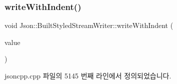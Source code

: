 \mbox{\label{struct_json_1_1_built_styled_stream_writer_a6e80e1a0d5f64df2ec48c3c3b1284990}} 
\subsubsection{\texorpdfstring{write\+With\+Indent()}{writeWithIndent()}}
{\footnotesize\ttfamily void Json\+::\+Built\+Styled\+Stream\+Writer\+::write\+With\+Indent (\begin{DoxyParamCaption}\item[{\hyperlink{json_8h_a1e723f95759de062585bc4a8fd3fa4be}{J\+S\+O\+N\+C\+P\+P\+\_\+\+S\+T\+R\+I\+NG} const \&}]{value }\end{DoxyParamCaption})\hspace{0.3cm}{\ttfamily [private]}}



jsoncpp.\+cpp 파일의 5145 번째 라인에서 정의되었습니다.



